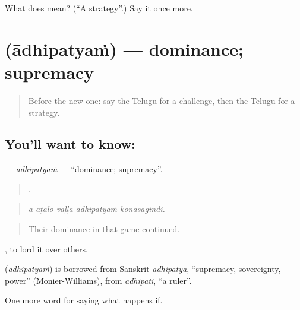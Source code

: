 \begin{tcolorbox}[breakable,colback=teal!4,colframe=teal!35!black,title={Before you move on}]
What does  mean? (\textquotedblleft{}A strategy\textquotedblright{}.) Say it once more.
\end{tcolorbox}
\section[\texorpdfstring{\te{ఆధిపత్యం} (ādhipatyaṁ)}{ఆధిపత్యం (ādhipatyaṁ)}]{ (ādhipatyaṁ) — dominance; supremacy}

\label{lesson:TE-C433-adhipatyam}



\begin{quote}
Before the new one: say the Telugu for a challenge, then the Telugu for a strategy.
\end{quote}

\subsection*{You'll want to know: }
\textbf{} — \emph{ādhipatyaṁ} — \textquotedblleft{}dominance; supremacy\textquotedblright{}.

\begin{quote}
    .
\end{quote}

\begin{quote}
\emph{ā āṭalō vāḷḷa ādhipatyaṁ konasāgindi.}
\end{quote}

\begin{quote}
Their dominance in that game continued.
\end{quote}

 , to lord it over others.

\begin{cousinweb}
\textbf{} (\emph{ādhipatyaṁ}) is borrowed from Sanskrit \emph{ādhipatya}, \textquotedblleft{}supremacy, sovereignty, power\textquotedblright{} (Monier-Williams), from \emph{adhipati}, \textquotedblleft{}a ruler\textquotedblright{}.
\end{cousinweb}

\begin{grammarlens}[title={What you've built}]
One more word for saying what happens if.
\end{grammarlens}

